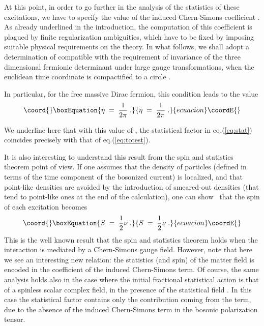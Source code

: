 \documentclass[a4paper,12pt]{article}
\begin{document}
At this point, in order to go further in the analysis of the
statistics of these excitations, we have to specify the value of the
induced Chern-Simons coefficient \myHighlight{$\eta$}\coordHE{}. As already underlined in the
introduction, the computation of this coefficient is plagued by finite
regularization ambiguities, which have to be fixed by imposing
suitable physical requirements on the theory. In what follows, we
shall adopt a determination of \myHighlight{$\eta$}\coordHE{} compatible with the requirement of
invariance of the three dimensional fermionic determinant under large
gauge transformations, when the euclidean time coordinate is
compactified to a circle \coordHE{}\cite{large}.


In particular, for the free massive Dirac fermion, this condition
leads to the value
\begin{equation}\coord{}\boxEquation{
\eta \;=\; \frac{1}{2\pi}\;.
}{
\eta \;=\; \frac{1}{2\pi}\;.
}{ecuacion}\coordE{}\end{equation}

We underline here that with this value of \myHighlight{$\eta$}\coordHE{}, the statistical factor
in eq.(\ref{eq:stat}) coincides precisely with that of
eq.(\ref{eq:totest}).


It is also interesting to understand this result from the spin and
statistics theorem point of view. If one assumes that the density of
particles (defined in terms of the time component of the bosonized
current) is localized, and that point-like densities are avoided by
the introduction of smeared-out densities (that tend to point-like
ones at the end of the calculation), one can show~\cite{lerda} that
the spin of each excitation becomes
\begin{equation}\coord{}\boxEquation{
  \label{eq:spin}
  S \;=\; \frac{1}{2} \nu \;.
}{
  S \;=\; \frac{1}{2} \nu \;.
}{ecuacion}\coordE{}\end{equation}
This is the well known result that the spin and statistics theorem
holds when the interaction is mediated by a Chern-Simons gauge field.
However, note that here we see an interesting new relation: the
statistics (and spin) of the matter field is encoded in the
coefficient of the induced Chern-Simons term. Of course, the same
analysis holds also in the case where the initial fractional
statistical action is that of a spinless scalar complex field, in the
presence of the statistical field \coordHE{}. In this case the statistical
factor \myHighlight{$\nu$}\coordHE{} contains only the contribution coming from the \myHighlight{$\theta$}\coordHE{} term,
due to the absence of the induced Chern-Simons term in the bosonic
polarization tensor.
\end{document}
